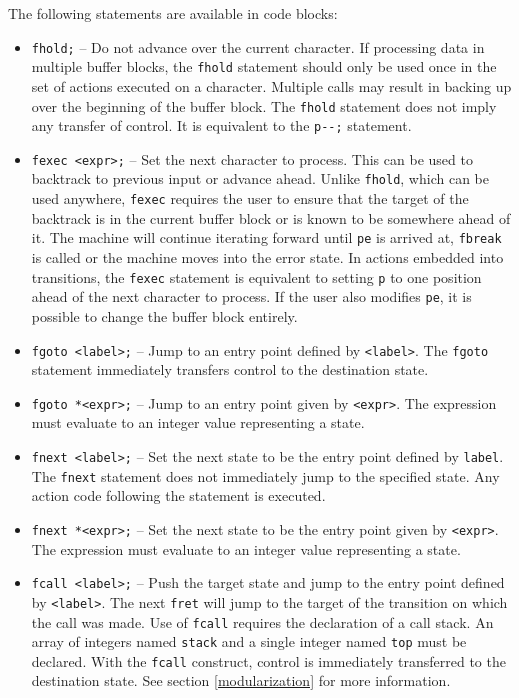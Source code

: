 \documentclass[letterpaper,11pt,oneside]{book}
\begin{document}
\noindent The following statements are available in code blocks:

\begin{itemize}

\item \verb|fhold;| -- Do not advance over the current character. If processing
data in multiple buffer blocks, the \verb|fhold| statement should only be used
once in the set of actions executed on a character.  Multiple calls may result
in backing up over the beginning of the buffer block. The \verb|fhold|
statement does not imply any transfer of control. It is equivalent to the
\verb|p--;| statement. 

\item \verb|fexec <expr>;| -- Set the next character to process. This can be
used to backtrack to previous input or advance ahead.
Unlike \verb|fhold|, which can be used
anywhere, \verb|fexec| requires the user to ensure that the target of the
backtrack is in the current buffer block or is known to be somewhere ahead of
it. The machine will continue iterating forward until \verb|pe| is arrived at,
\verb|fbreak| is called or the machine moves into the error state. In actions
embedded into transitions, the \verb|fexec| statement is equivalent to setting
\verb|p| to one position ahead of the next character to process.  If the user
also modifies \verb|pe|, it is possible to change the buffer block entirely.

\item \verb|fgoto <label>;| -- Jump to an entry point defined by
\verb|<label>|.  The \verb|fgoto| statement immediately transfers control to
the destination state.

\item \verb|fgoto *<expr>;| -- Jump to an entry point given by \verb|<expr>|.
The expression must evaluate to an integer value representing a state.

\item \verb|fnext <label>;| -- Set the next state to be the entry point defined
by \verb|label|.  The \verb|fnext| statement does not immediately jump to the
specified state. Any action code following the statement is executed.

\item \verb|fnext *<expr>;| -- Set the next state to be the entry point given
by \verb|<expr>|. The expression must evaluate to an integer value representing
a state.

\item \verb|fcall <label>;| -- Push the target state and jump to the entry
point defined by \verb|<label>|.  The next \verb|fret| will jump to the target
of the transition on which the call was made. Use of \verb|fcall| requires
the declaration of a call stack. An array of integers named \verb|stack| and a
single integer named \verb|top| must be declared. With the \verb|fcall|
construct, control is immediately transferred to the destination state.
See section \ref{modularization} for more information.


\end{itemize}
\end{document}
